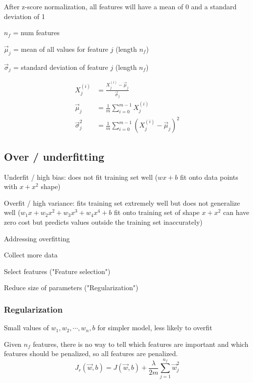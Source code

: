 \documentclass[12pt]{article}
\begin{document}
After z-score normalization, all features will have a mean of 0 and a standard deviation of 1

$n_f$ = num features

$\vec{\mu}_j$ = mean of all values for feature $j$ (length $n_f$)

$\vec{\sigma}_j$ = standard deviation of feature $j$ (length $n_f$)

\begin{align*}
    X_j^{(i)} &= \frac{X_j^{(i)} - \vec{\mu}_j}{\vec{\sigma}_j}\\
    \vec{\mu}_j &= \frac{1}{m} \sum_{i=0}^{m-1} X_j^{(i)}\\
    \vec{\sigma}_j^2 &= \frac{1}{m} \sum_{i=0}^{m-1} (X_j^{(i)} - \vec{\mu}_j)^2
\end{align*}

\subsection{Over / underfitting}

Underfit / high bias: does not fit training set well ($wx + b$ fit onto data points with $x + x^2$ shape)

Overfit / high variance: fits training set extremely well but does not generalize well ($w_1 x + w_2 x^2 + w_3 x^3 + w_4 x^4 + b$ fit onto training set of shape $x + x^2$ can have zero cost but predicts values outside the training set inaccurately)

\vspace{5px}

Addressing overfitting
\begin{myitemize}
	\item Collect more data
	\item Select features ("Feature selection")
	\item Reduce size of parameters ("Regularization")
\end{myitemize}

\subsubsection{Regularization}

Small values of $w_1,w_2,\cdots,w_n,b$ for simpler model, less likely to overfit

Given $n_f$ features, there is no way to tell which features are important and which features should be penalized, so all features are penalized.
\[ J_r(\vec{w},b) = J(\vec{w},b) + \frac{\lambda}{2m} \sum_{j=1}^{n_f} \vec{w}_j^2 \]
\end{document}
